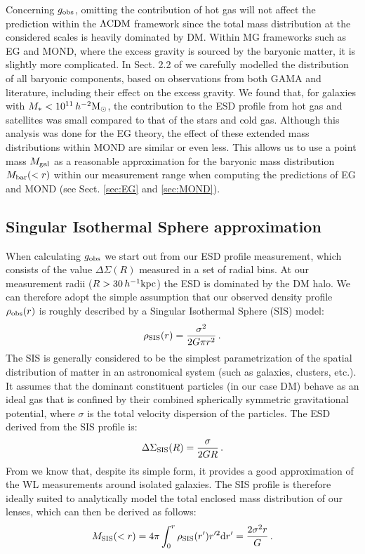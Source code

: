 \documentclass[usenatbib]{mnras}
\newcommand{\hmsun}{\,h^{-2} {\rm M_\odot}}
\newcommand{\hkpc}{\, h^{-1}{\rm{kpc}} }
\newcommand{\lcdm}{{\rm \Lambda CDM}}
\newcommand{\un}[1]{_{\rm #1}}
\begin{document}
Concerning $g\un{obs}$, omitting the contribution of hot gas will not affect the prediction within the $\lcdm$ framework since the total mass distribution at the considered scales is heavily dominated by DM. Within MG frameworks such as EG and MOND, where the excess gravity is sourced by the baryonic matter, it is slightly more complicated. In Sect. 2.2 of \cite{brouwer2017} we carefully modelled the distribution of all baryonic components, based on observations from both GAMA and literature, including their effect on the excess gravity. We found that, for galaxies with $M_*<10^{11}\hmsun$, the contribution to the ESD profile from hot gas and satellites was small compared to that of the stars and cold gas. Although this analysis was done for the EG theory, the effect of these extended mass distributions within MOND are similar or even less. This allows us to use a point mass $M\un{gal}$ as a reasonable approximation for the baryonic mass distribution $M\un{bar}(<r)$ within our measurement range when computing the predictions of EG and MOND (see Sect. \ref{sec:EG} and \ref{sec:MOND}).

\subsection{Singular Isothermal Sphere approximation}
\label{sec:SIS_approximation}

When calculating $g\un{obs}$ we start out from our ESD profile measurement, which consists of the value $\Delta\Sigma(R)$ measured in a set of radial bins. At our measurement radii ($R>30\hkpc$) the ESD is dominated by the DM halo. We can therefore adopt the simple assumption that our observed density profile $\rho\un{obs}(r)$ is roughly described by a Singular Isothermal Sphere (SIS) model:
\begin{equation}\label{eq:rho_SIS}
	\rho\un{SIS}(r) = \frac{\sigma^2}{2 G \pi r^2} \, . 
\end{equation}
The SIS is generally considered to be the simplest parametrization of the spatial distribution of matter in an astronomical system (such as galaxies, clusters, etc.). It assumes that the dominant constituent particles (in our case DM) behave as an ideal gas that is confined by their combined spherically symmetric gravitational potential, where $\sigma$ is the total velocity dispersion of the particles. The ESD derived from the SIS profile is:
\begin{equation}\label{eq:ESD_SIS}
\Delta\Sigma\un{SIS}(R) = \frac{\sigma}{2 G R} \, .
\end{equation}
From \cite{brouwer2017} we know that, despite its simple form, it provides a good approximation of the WL measurements around isolated galaxies. The SIS profile is therefore ideally suited to analytically model the total enclosed mass distribution of our lenses, which can then be derived as follows:
\begin{equation}\label{eq:mass_SIS}
	M\un{SIS}(<r) = 4 \pi \int_{0}^{r}\rho\un{SIS}(r') r'^2 {\rm d} r' = \frac{2\sigma^2 r}{G} \, .
\end{equation}
\end{document}
